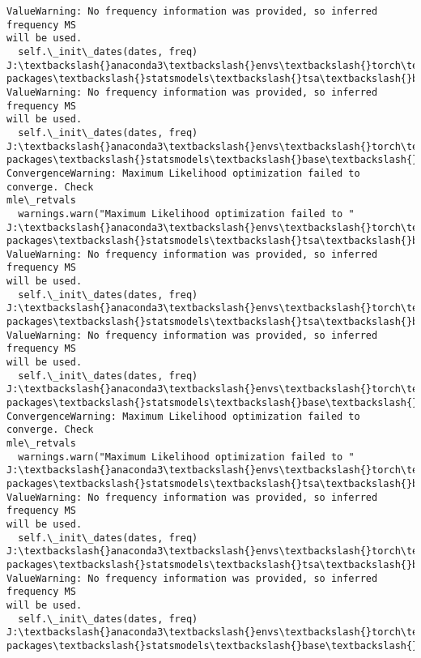\documentclass[11pt]{article}
\begin{document}
\begin{Verbatim}[commandchars=\\\{\}]
ValueWarning: No frequency information was provided, so inferred frequency MS
will be used.
  self.\_init\_dates(dates, freq)
J:\textbackslash{}anaconda3\textbackslash{}envs\textbackslash{}torch\textbackslash{}Lib\textbackslash{}site-packages\textbackslash{}statsmodels\textbackslash{}tsa\textbackslash{}base\textbackslash{}tsa\_model.py:473:
ValueWarning: No frequency information was provided, so inferred frequency MS
will be used.
  self.\_init\_dates(dates, freq)
J:\textbackslash{}anaconda3\textbackslash{}envs\textbackslash{}torch\textbackslash{}Lib\textbackslash{}site-packages\textbackslash{}statsmodels\textbackslash{}base\textbackslash{}model.py:607:
ConvergenceWarning: Maximum Likelihood optimization failed to converge. Check
mle\_retvals
  warnings.warn("Maximum Likelihood optimization failed to "
J:\textbackslash{}anaconda3\textbackslash{}envs\textbackslash{}torch\textbackslash{}Lib\textbackslash{}site-packages\textbackslash{}statsmodels\textbackslash{}tsa\textbackslash{}base\textbackslash{}tsa\_model.py:473:
ValueWarning: No frequency information was provided, so inferred frequency MS
will be used.
  self.\_init\_dates(dates, freq)
J:\textbackslash{}anaconda3\textbackslash{}envs\textbackslash{}torch\textbackslash{}Lib\textbackslash{}site-packages\textbackslash{}statsmodels\textbackslash{}tsa\textbackslash{}base\textbackslash{}tsa\_model.py:473:
ValueWarning: No frequency information was provided, so inferred frequency MS
will be used.
  self.\_init\_dates(dates, freq)
J:\textbackslash{}anaconda3\textbackslash{}envs\textbackslash{}torch\textbackslash{}Lib\textbackslash{}site-packages\textbackslash{}statsmodels\textbackslash{}base\textbackslash{}model.py:607:
ConvergenceWarning: Maximum Likelihood optimization failed to converge. Check
mle\_retvals
  warnings.warn("Maximum Likelihood optimization failed to "
J:\textbackslash{}anaconda3\textbackslash{}envs\textbackslash{}torch\textbackslash{}Lib\textbackslash{}site-packages\textbackslash{}statsmodels\textbackslash{}tsa\textbackslash{}base\textbackslash{}tsa\_model.py:473:
ValueWarning: No frequency information was provided, so inferred frequency MS
will be used.
  self.\_init\_dates(dates, freq)
J:\textbackslash{}anaconda3\textbackslash{}envs\textbackslash{}torch\textbackslash{}Lib\textbackslash{}site-packages\textbackslash{}statsmodels\textbackslash{}tsa\textbackslash{}base\textbackslash{}tsa\_model.py:473:
ValueWarning: No frequency information was provided, so inferred frequency MS
will be used.
  self.\_init\_dates(dates, freq)
J:\textbackslash{}anaconda3\textbackslash{}envs\textbackslash{}torch\textbackslash{}Lib\textbackslash{}site-packages\textbackslash{}statsmodels\textbackslash{}base\textbackslash{}model.py:607:

\end{Verbatim}
\end{document}
